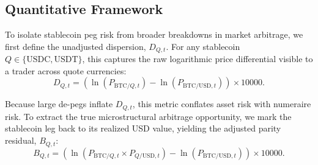 \documentclass[12pt,twocolumn]{article}
\begin{document}
\begin{table}[H]
\label{tab:data_coverage}
\footnotesize
{}
\caption{1-minute data coverage and forward-fill exposure on the unified UTC grid. Coverage = non-missing share; FF share = carry-forward share (max 5 minutes).}
\end{table}

\subsection{Quantitative Framework}

To isolate stablecoin peg risk from broader breakdowns in market arbitrage, we first define the {unadjusted dispersion}, $D_{Q,t}$. For any stablecoin $Q\in\{\text{USDC}, \text{USDT}\}$, this captures the raw logarithmic price differential visible to a trader across quote currencies:
\begin{equation}
    D_{Q,t}=\left(\ln(P_{\text{BTC}/Q,t})-\ln(P_{\text{BTC/USD},t})\right)\times 10000.
\end{equation}

Because large de-pegs inflate $D_{Q,t}$, this metric conflates asset risk with numeraire risk. To extract the true microstructural arbitrage opportunity, we mark the stablecoin leg back to its realized USD value, yielding the {adjusted parity residual}, $B_{Q,t}$:
{\small\begin{equation}
    B_{Q,t} = \left(\ln(P_{\text{BTC}/Q,t}\times P_{Q/\text{USD},t})-\ln(P_{\text{BTC/USD},t})\right)\times 10000.
\end{equation}}
\end{document}
